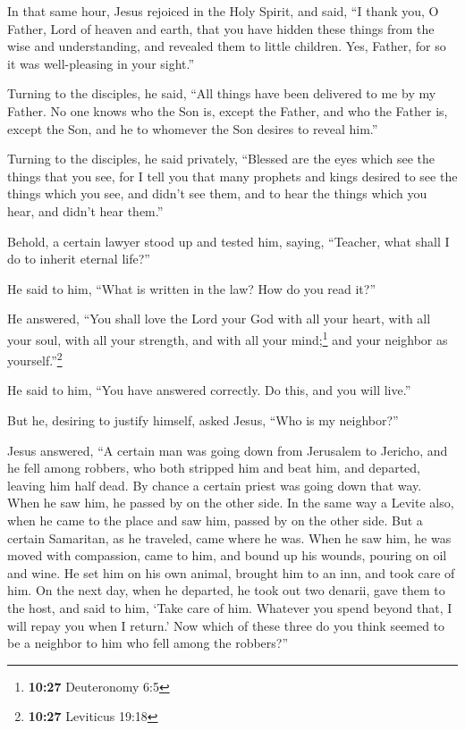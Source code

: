  In that same hour, Jesus rejoiced in the Holy Spirit,
and said, ``I thank you, O Father, Lord of heaven and earth, that you
have hidden these things from the wise and understanding, and revealed
them to little children. Yes, Father, for so it was well-pleasing in
your sight.''

 Turning to the disciples, he said, ``All things have
been delivered to me by my Father. No one knows who the Son is, except
the Father, and who the Father is, except the Son, and he to whomever
the Son desires to reveal him.''

 Turning to the disciples, he said privately, ``Blessed
are the eyes which see the things that you see,  for I
tell you that many prophets and kings desired to see the things which
you see, and didn't see them, and to hear the things which you hear, and
didn't hear them.''

 Behold, a certain lawyer stood up and tested him,
saying, ``Teacher, what shall I do to inherit eternal life?''

 He said to him, ``What is written in the law? How do you
read it?''

 He answered, ``You shall love the Lord your God with all
your heart, with all your soul, with all your strength, and with all
your mind;\footnote{\textbf{10:27} Deuteronomy 6:5} and your neighbor as
yourself.''\footnote{\textbf{10:27} Leviticus 19:18}

 He said to him, ``You have answered correctly. Do this,
and you will live.''

 But he, desiring to justify himself, asked Jesus, ``Who
is my neighbor?''

 Jesus answered, ``A certain man was going down from
Jerusalem to Jericho, and he fell among robbers, who both stripped him
and beat him, and departed, leaving him half dead.  By
chance a certain priest was going down that way. When he saw him, he
passed by on the other side.  In the same way a Levite
also, when he came to the place and saw him, passed by on the other
side.  But a certain Samaritan, as he traveled, came
where he was. When he saw him, he was moved with compassion,
 came to him, and bound up his wounds, pouring on oil and
wine. He set him on his own animal, brought him to an inn, and took care
of him.  On the next day, when he departed, he took out
two denarii, gave them to the host, and said to him, `Take care of him.
Whatever you spend beyond that, I will repay you when I return.'
 Now which of these three do you think seemed to be a
neighbor to him who fell among the robbers?''

